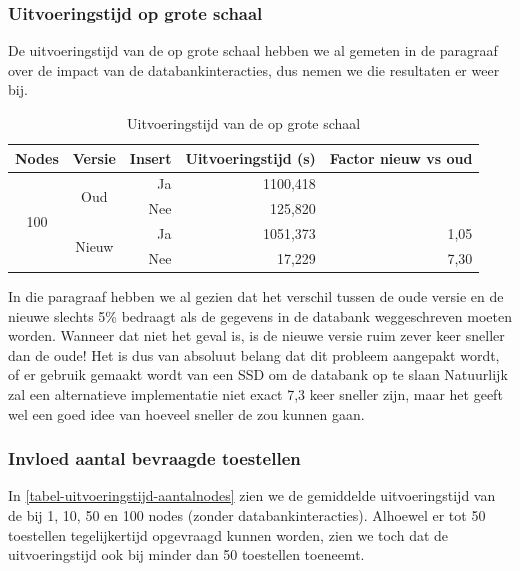 \subsubsection{Uitvoeringstijd op grote schaal}

De uitvoeringstijd van de \nwmretriever{} op grote schaal hebben we al gemeten in de paragraaf over de impact van de databankinteracties,
dus nemen we die resultaten er weer bij.

\begin{table}[h]
\centering
\begin{tabular}{@{}ccrrr@{}}
\toprule
\multicolumn{1}{l}{Nodes} & \multicolumn{1}{l}{Versie} & Insert & Uitvoeringstijd (s) & Factor nieuw vs oud \\ \midrule
\multirow{4}{*}{100}      & \multirow{2}{*}{Oud}       & Ja     & 1100,418            &                     \\
                          &                            & Nee    & 125,820             &                     \\
                          & \multirow{2}{*}{Nieuw}     & Ja     & 1051,373            & 1,05                \\
                          &                            & Nee    & 17,229              & 7,30                \\ \bottomrule
\end{tabular}
\caption{Uitvoeringstijd van de \nwmretriever{} op grote schaal}
\label{tabel-uitvoeringstijd-vwall}
\end{table}

In die paragraaf hebben we al gezien dat het verschil tussen de oude versie en de nieuwe slechts 5\% bedraagt
als de gegevens in de databank weggeschreven moeten worden.
Wanneer dat niet het geval is, is de nieuwe versie ruim zever keer sneller dan de oude!
Het is dus van absoluut belang dat dit probleem aangepakt wordt, of er gebruik gemaakt wordt van een SSD om de databank op te slaan
Natuurlijk zal een alternatieve implementatie niet exact 7,3 keer sneller zijn, maar het geeft wel een goed idee
van hoeveel sneller de \nwmretriever{} zou kunnen gaan.

\subsubsection{Invloed aantal bevraagde toestellen}

In \cref{tabel-uitvoeringstijd-aantalnodes} zien we de gemiddelde uitvoeringstijd van de \nwmretriever{} bij 1, 10, 50 en 100 nodes (zonder databankinteracties).
Alhoewel er tot 50 toestellen tegelijkertijd opgevraagd kunnen worden, zien we toch dat de uitvoeringstijd ook bij minder dan 50 toestellen toeneemt.

